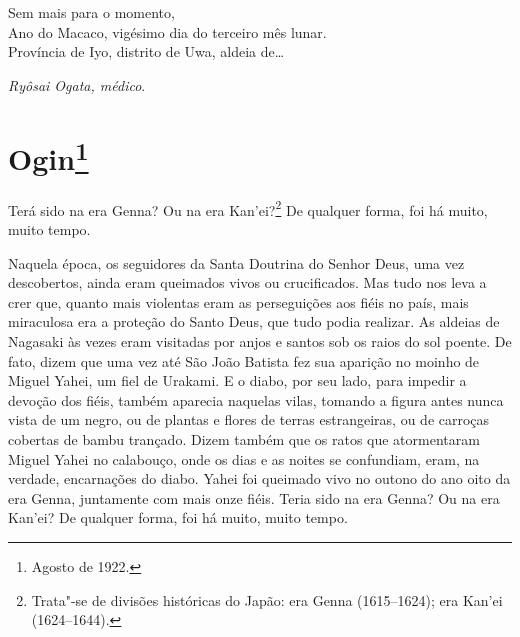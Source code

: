 \medskip

\noindent Sem mais para o momento,\\
Ano do Macaco, vigésimo dia do terceiro mês lunar.\\
Província de Iyo, distrito de Uwa, aldeia de\ldots{}\\

\begin{flushright}
\smallskip
\textit{Ryôsai Ogata, médico}.
\end{flushright}

\chapter{Ogin\footnote{Agosto de 1922.}}

\noindent{}Terá sido na era Genna? Ou na era Kan'ei?\footnote{ Trata"-se de divisões
históricas do Japão: era Genna (1615--1624); era Kan'ei (1624--1644).}
De qualquer forma, foi há muito, muito tempo.

Naquela época, os seguidores da Santa Doutrina do Senhor Deus, uma vez
descobertos, ainda eram queimados vivos ou crucificados. Mas tudo nos
leva a crer que, quanto mais violentas eram as perseguições aos fiéis
no país, mais miraculosa era a proteção do Santo Deus, que tudo podia
realizar. As aldeias de Nagasaki às vezes eram visitadas por anjos e
santos sob os raios do sol poente. De fato, dizem que uma vez até São
João Batista fez sua aparição no moinho de Miguel Yahei, um fiel de
Urakami. E o diabo, por seu lado, para impedir a devoção dos fiéis,
também aparecia naquelas vilas, tomando a figura antes nunca vista de
um negro, ou de plantas e flores de terras estrangeiras, ou de carroças
cobertas de bambu trançado. Dizem também que os ratos que atormentaram
Miguel Yahei no calabouço, onde os dias e as noites se confundiam, eram, na verdade,
encarnações do diabo. Yahei foi queimado vivo no outono do ano oito da
era Genna, juntamente com mais onze fiéis. Teria sido na era Genna? Ou
na era Kan'ei? De qualquer forma, foi há muito, muito tempo.

